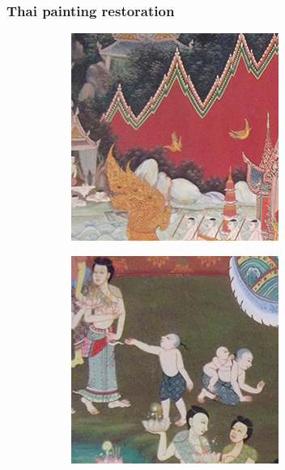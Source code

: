 \documentclass[xcolor=dvipsnames, xetex,serif]{beamer}
\begin{document}
    \begin{frame}
        \frametitle{Thai painting restoration}
        \begin{figure}[H]
            \centering
            \begin{subfigure}{0.15\linewidth}
                \centering
                \includegraphics[width=0.9\linewidth]{images/thaiart/case01-original.png}
            \end{subfigure}
            \begin{subfigure}{0.15\linewidth}
                \centering
                \includegraphics[width=0.9\linewidth]{images/thaiart/case02-original.png}

\end{subfigure}
\end{figure}
\end{frame}
\end{document}
